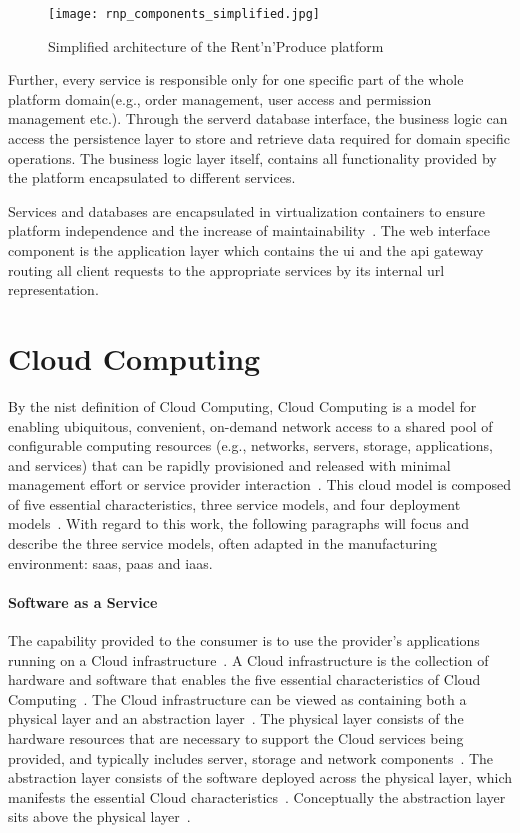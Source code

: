 \documentclass[
a4paper,
twoside,
headsepline,
cleardoublepage=empty,
parskip=half,
draft=false
]{scrbook}
\begin{document}
			\begin{figure}[H]
				\centering
				\texttt{[image: rnp\_components\_simplified.jpg]}
				\caption{Simplified architecture of the Rent'n'Produce platform}
				\label{fig:rnp_architecture}
			\end{figure}

			Further, every service is responsible only for one specific part of the whole platform domain(e.g., order management, user access and permission management etc.).
			Through the serverd database interface, the business logic can access the persistence layer to store and retrieve data required for domain specific operations.
			The business logic layer itself, contains all functionality provided by the platform encapsulated to different services.

			Services and databases are encapsulated in virtualization containers to ensure platform independence and the increase of maintainability~\cite{xen.17b}.
			The web interface component is the application layer which contains the \gls{ui} and the \gls{api} gateway routing all client requests to the appropriate services by its internal \gls{url} representation.

		\section{Cloud Computing}\label{sec:cloud_computing}

			By the \gls{nist} definition of Cloud Computing, Cloud Computing is a model for enabling ubiquitous, convenient, on-demand network access to a shared pool of configurable computing resources (e.g., networks, servers, storage, applications, and services) that can be rapidly provisioned and released with minimal management effort or service provider interaction~\cite{mell2011nist}.
			This cloud model is composed of five essential characteristics, three service models, and four deployment
			models~\cite{fehling2014cloud}. 
			With regard to this work, the following paragraphs will focus and describe the three service models, often adapted in the manufacturing environment: \gls{saas}, \gls{paas} and \gls{iaas}.

			\paragraph{Software as a Service} The capability provided to the consumer is to use the provider's applications running on a Cloud infrastructure~\cite{mell2011nist}.
			A Cloud infrastructure is the collection of hardware and software that enables the five essential characteristics of Cloud Computing~\cite{mell2011nist}. 
			The Cloud infrastructure can be viewed as containing both a physical layer and an abstraction layer~\cite{fehling2014cloud}. 
			The physical layer consists of the hardware resources that are necessary to support the Cloud services being provided, and typically includes server, storage and network components~\cite{fehling2014cloud}.
			The abstraction layer consists of the software deployed across the physical layer, which manifests the essential Cloud characteristics~\cite{fehling2014cloud}. 
			Conceptually the abstraction layer sits above the physical layer~\cite{fehling2014cloud}.
			
\end{document}
